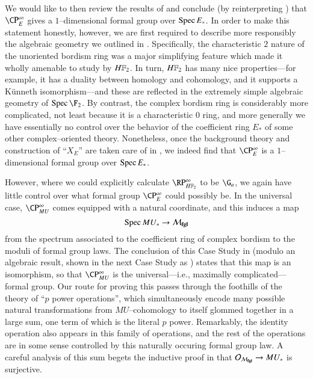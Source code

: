 We would like to then review the results of  and conclude (by reinterpreting ) that $\CP^\infty_E$ gives a $1$--dimensional formal group over $\operatorname{Spec} E_*$.  In order to make this statement honestly, however, we are first required to describe more responsibly the algebraic geometry we outlined in .  Specifically, the characteristic $2$ nature of the unoriented bordism ring was a major simplifying feature which made it wholly amenable to study by $\HFtwo$.  In turn, $\HFtwo$ has many nice properties---for example, it has a duality between homology and cohomology, and it supports a K\"unneth isomorphism---and these are reflected in the extremely simple algebraic geometry of $\Spec \F_2$.  By contrast, the complex bordism ring is considerably more complicated, not least because it is a characteristic $0$ ring, and more generally we have essentially no control over the behavior of the coefficient ring $E_*$ of some other complex--oriented theory.  Nonetheless, once the background theory and construction of ``$X_E$'' are taken care of in , we indeed find that $\CP^\infty_E$ is a $1$--dimensional formal group over $\operatorname{Spec} E_*$.

However, where we could explicitly calculate $\RP^\infty_{\HFtwo}$ to be $\G_a$, we again have little control over what formal group $\CP^\infty_E$ could possibly be.  In the universal case, $\CP^\infty_{MU}$ comes equipped with a natural coordinate, and this induces a map \[\operatorname{Spec} MU_* \to \mathcal{M}_{\mathbf{fgl}}\] from the spectrum associated to the coefficient ring of complex bordism to the moduli of formal group laws.  The conclusion of this Case Study in  (modulo an algebraic result, shown in the next Case Study as ) states that this map is an isomorphism, so that $\CP^\infty_{MU}$ is the universal---i.e., maximally complicated---formal group.  Our route for proving this passes through the foothills of the theory of ``$p${\th} power operations'', which simultaneously encode many possible natural transformations from $MU$--cohomology to itself glommed together in a large sum, one term of which is the literal $p${\th} power.  Remarkably, the identity operation also appears in this family of operations, and the rest of the operations are in some sense controlled by this naturally occuring formal group law.  A careful analysis of this sum begets the inductive proof in  that $\mathcal{O}_{\mathcal{M}_{\mathbf{fgl}}} \to MU_*$ is surjective.


